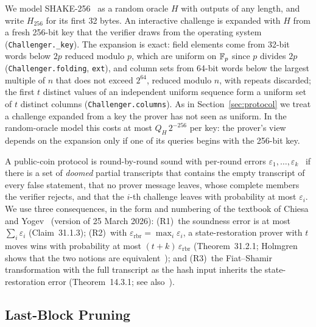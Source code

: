 We model SHAKE-256~\cite{fips202} as a random oracle $H$ with
outputs of any length, and write $H_{256}$ for its first 32 bytes. An interactive challenge is
expanded with $H$ from a fresh 256-bit key that the verifier draws from the operating system
(\texttt{Challenger.\_key}). The expansion is exact: field elements come from 32-bit words below
$2p$ reduced modulo $p$, which are uniform on $\mathbb{F}_p$ since $p$ divides $2p$
(\texttt{Challenger.folding}, \texttt{ext}), and column sets from 64-bit words below the largest
multiple of $n$ that does not exceed $2^{64}$, reduced modulo $n$, with repeats discarded; the
first $t$ distinct values of an independent uniform sequence form a uniform set of $t$ distinct
columns (\texttt{Challenger.columns}). As in Section~\ref{sec:protocol} we treat a
challenge expanded from a key the prover has not seen as uniform. In the random-oracle model this
costs at most $Q_H\,2^{-256}$ per key: the prover's view depends on the expansion only if one of its
queries begins with the 256-bit key.

 A public-coin protocol is round-by-round sound with per-round
errors $\varepsilon_1,\dots,\varepsilon_k$~\cite{canetti2019fs} if there is a set of \emph{doomed}
partial transcripts that contains the empty transcript of every false statement, that no prover
message leaves, whose complete members the verifier rejects, and that the $i$-th challenge leaves
with probability at most $\varepsilon_i$. We use three consequences, in the form and numbering of
the textbook of Chiesa and Yogev~\cite{chiesa2024snargs} (version of 25 March 2026):
(R1)~the soundness error is at most $\sum_i\varepsilon_i$ (Claim~31.1.3);
(R2)~with $\varepsilon_{\mathrm{rbr}}=\max_i\varepsilon_i$, a state-restoration prover with $t$
moves wins with probability at most $(t+k)\,\varepsilon_{\mathrm{rbr}}$ (Theorem~31.2.1; Holmgren
shows that the two notions are equivalent~\cite{holmgren2019rbr}); and
(R3)~the Fiat--Shamir transformation with the full transcript as the hash input inherits the
state-restoration error (Theorem~14.3.1; see also~\cite{bcs16}).

\subsection{Last-Block Pruning}
\label{app:prune}

